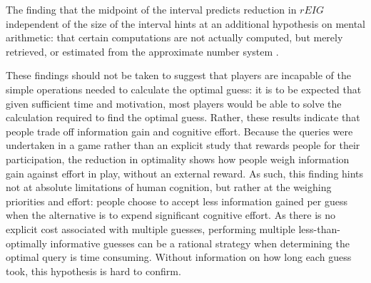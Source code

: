 \documentclass[10pt,letterpaper]{article}
\begin{document}

The finding that the midpoint of the interval predicts reduction in $rEIG$ independent of the size of the interval hints at an additional hypothesis on mental arithmetic: that certain computations are not actually computed, but merely retrieved, or estimated from the approximate number system \cite{dehaene2011number, zbrodoff19959+}. 

These findings should not be taken to suggest that players are incapable of the simple operations needed to calculate the optimal guess: it is to be expected that given sufficient time and motivation, most players would be able to solve the calculation required to find the optimal guess. 
Rather, these results indicate that people trade off information gain and cognitive effort. Because the queries were undertaken in a game rather than an explicit study that rewards people for their participation, the reduction in optimality shows how people weigh information gain against effort in play, without an external reward.
As such, this finding hints not at absolute limitations of human cognition, but rather at the weighing priorities and effort: people choose to accept less information gained per guess when the alternative is to expend significant cognitive effort. 
As there is no explicit cost associated with multiple guesses, performing multiple less-than-optimally informative guesses can be a rational strategy when determining the optimal query is time consuming. Without information on how long each guess took, this hypothesis is hard to confirm. 
\end{document}
